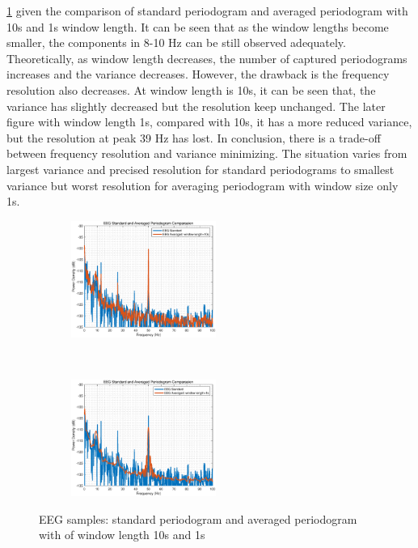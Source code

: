 \ref{fig:1_2_b_2} given the comparison of standard periodogram and averaged periodogram with 10s and 1s window length. It can be seen that as the window lengths become smaller, the components in 8-10 Hz can be still observed adequately.  Theoretically, as window length decreases, the number of captured periodograms increases and the variance decreases. However, the drawback is the frequency resolution also decreases. 
At window length is 10s, it can be seen that, the variance has slightly decreased but the resolution keep unchanged. The later figure with window length 1s, compared with 10s, it has a more reduced variance, but the resolution at peak 39 Hz has lost.
In conclusion, there is a trade-off between frequency resolution and variance minimizing. The situation varies from largest variance and precised resolution for standard periodograms to smallest variance but worst resolution for averaging periodogram with window size only 1s. 
\begin{figure}[H]
    \centering
    \begin{subfigure}{0.35\textwidth}
        \centering
        \includegraphics[height=1.5in]{Part1/1_2_b_3.eps}
    \end{subfigure}
    ~ 
    \begin{subfigure}{0.35\textwidth}
        \centering
        \includegraphics[height=1.5in]{Part1/1_2_b_4.eps}
    \end{subfigure}
    \caption{EEG samples: standard periodogram and averaged  periodogram with of window length 10s and 1s}
    \label{fig:1_2_b_2}
\end{figure}

